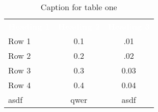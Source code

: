 
\begin{table}[H]
\centering
\caption{Caption for table one}
\label{tab:table1}
\begin{tabular}{@{}lcc@{}}
\rowcolor{mqBrightRed}

\textcolor{white}{\textbf{Heading 1}} & \textcolor{white}{\textbf{Heading 2}} & \textcolor{white}{\textbf{Heading 3}} \\ 
Row 1 & 0.1 & .01 \\
Row 2 & 0.2 & .02 \\
Row 3 & 0.3 & 0.03 \\
Row 4 & 0.4 & 0.04 \\ 
\rowcolor{mqDeepRed}
asdf & qwer & asdf

\end{tabular}
\end{table}